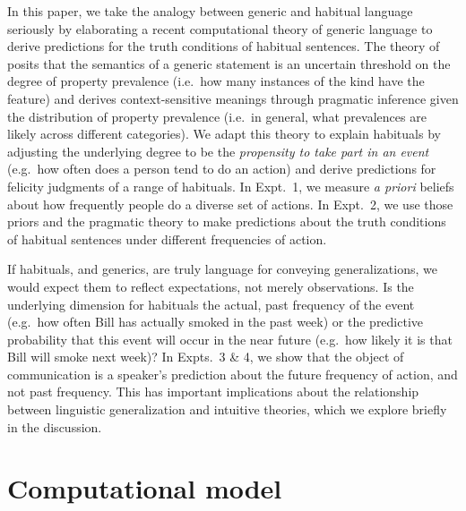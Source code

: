\documentclass[10pt,letterpaper]{article}
\newcommand{\ndg}[1]{\textcolor{Green}{[ndg: #1]}}
\newcommand{\mht}[1]{\textcolor{DarkOrange}{[mht: #1]}}
\begin{document}
In this paper, we take the analogy between generic and habitual language seriously by elaborating a recent computational theory of generic language to derive predictions for the truth conditions of habitual sentences. 
The theory of  posits that the semantics of a generic statement is an uncertain threshold on the degree of property prevalence (i.e.~how many instances of the kind have the feature) and derives context-sensitive meanings through pragmatic inference given the distribution of property prevalence (i.e.~in general, what prevalences are  likely across different categories).
We adapt this theory to explain habituals by adjusting the underlying degree to be the \emph{propensity to take part in an event} (e.g.~how often does a person tend to do an action) and derive predictions for felicity judgments of a range of habituals.
In Expt.~1, we measure \emph{a priori} beliefs about how frequently people do a diverse set of actions.
In Expt.~2, we use those priors and the pragmatic theory to make predictions about the truth conditions of habitual sentences under different frequencies of action. 


If habituals, and generics, are truly language for conveying generalizations, we would expect them to reflect expectations, not merely observations.
Is the underlying dimension for habituals the actual, past frequency of the event (e.g.~how often Bill has actually smoked in the past week) or the predictive probability that this event will occur in the near future (e.g.~how likely it is that Bill will smoke next week)?
In Expts.~3 \& 4, we show that the object of communication is a speaker's prediction about the future frequency of action, and not past frequency.
This has important implications about the relationship between linguistic generalization and intuitive theories, which we explore briefly in the discussion.


\section{Computational model}
\end{document}
